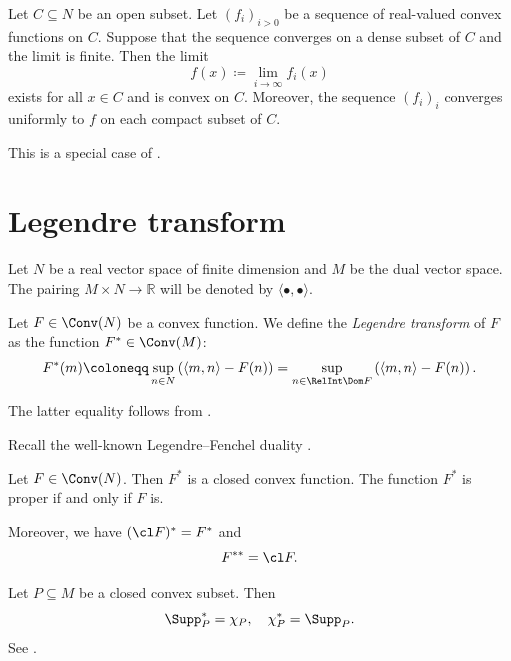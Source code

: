 \begin{theorem}\label{thm:seqconv}
    Let $C\subseteq N$ be an open subset. Let $(f_i)_{i>0}$ be a sequence of real-valued convex functions on $C$. Suppose that the sequence converges on a dense subset of $C$ and the limit is finite. Then the limit
    \[
    f(x)\coloneqq \lim_{i\to\infty} f_i(x)
    \]
    exists for all $x\in C$ and is convex on $C$. Moreover, the sequence $(f_i)_i$ converges uniformly to $f$ on each compact subset of $C$.
\end{theorem}
This is a special case of \cite[Theorem~10.8]{Roc70}.


\section{Legendre transform}\label{sec:Leg}
Let $N$ be a real vector space of finite dimension and $M$ be the dual vector space.
The pairing $M\times N\rightarrow \mathbb{R}$ will be denoted by $\langle \bullet, \bullet \rangle$.

\begin{definition}\label{def:Legendregeneral}
    Let $F\in \Conv(N)$ be a convex function. We define the \emph{Legendre transform} of $F$ as the function $F^*\in \Conv(M)$:
    \begin{equation}\label{eq:Legtrandef}
        F^*(m)\coloneqq \sup_{n\in N} \left( \langle m,n \rangle-F(n) \right)=\sup_{n\in \RelInt \Dom F} \left( \langle m,n \rangle-F(n) \right).
    \end{equation}
\end{definition}
The latter equality follows from \cite[Corollary~12.2.2]{Roc70}.

Recall the well-known Legendre--Fenchel duality \cite[Theorem~12.2]{Roc70}.
\begin{theorem}\label{thm:Legendredual}
    Let $F\in \Conv(N)$. Then $F^*$ is a closed convex function. The function $F^*$ is proper if and only if $F$ is.

    Moreover, we have $(\cl F)^*=F^*$ and
    \[
        F^{**}=\cl F.
    \]
\end{theorem}

\begin{example}\label{ex:suppfundual}
    Let $P\subseteq M$ be a closed convex subset. Then
    \[
    \Supp_P^*=\chi_P,\quad \chi_P^*=\Supp_P.
    \]
    See \cite[Theorem~13.2]{Roc70}.
\end{example}

